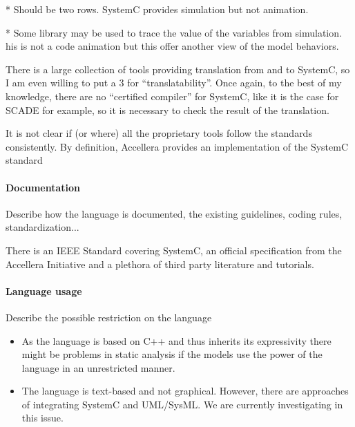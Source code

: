 \begin{author_comment}
* Should be two rows. SystemC provides simulation but not animation.
\end{author_comment}
\begin{assessor1}
* Some library may be used to trace the value of  the variables from
simulation. his is not a code animation but this offer another view of
the model behaviors.
\end{assessor1}

\begin{assessor2}
\item[(*)] There is a large collection of tools providing translation
  from and to SystemC, so I am even willing to put a 3 for
  ``translatability''. Once again, to the best of my knowledge, there
  are no ``certified compiler'' for SystemC, like it is the case for
  SCADE for example, so it is necessary to check the result of the
  translation.
\item[(**)] It is not clear if (or where) all the proprietary tools
  follow the standards consistently. By definition, Accellera provides
  an implementation of the SystemC standard 
\end{assessor2}

\paragraph{Documentation} Describe how the language is documented, the existing guidelines, coding rules, standardization...

There is an IEEE Standard covering SystemC, an official specification from the Accellera Initiative and a plethora of third party literature and tutorials.

\paragraph{Language usage} Describe the possible restriction on the language

\begin{itemize}
\item As the language is based on C++ and thus inherits its expressivity there might be problems in static analysis if the models use the power of the language in an unrestricted manner.
\item The language is text-based and not graphical. However, there are approaches of integrating SystemC and UML/SysML. We are currently investigating in this issue.
\end{itemize}


